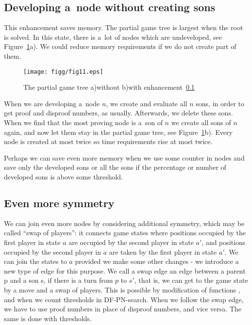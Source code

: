 \subsection{Developing a~node without creating sons} \label{lastenh}

This enhancement saves memory. The partial game tree is largest when the root is
solved. In this state, there is a~lot of nodes which are undeveloped, see 
Figure~\ref{jedenact}a). We could reduce memory requirements if we do not
create part of them. 

\begin{figure}
	\centerline{\mbox{\texttt{[image: figg/fig11.eps]}}}
	\caption{The partial game tree a)without b)with enhancement~\ref{lastenh}}
	\label{jedenact}
\end{figure}

When we are developing a~node $n$, we create and evaluate all $n$ sons, in order
to get proof and disproof numbers, as usually. Afterwards, we delete these
sons. When we find that the  most proving node is a~son of $n$ we create all
sons of $n$ again, and now let them stay in the partial game tree, see
Figure~\ref{jedenact}b). Every node is created at most twice so time
requirements rise at most twice.  

Perhaps we can save even more memory when we use some counter in nodes
and save only the developed sons or all the sons if the percentage or number 
of developed sons is above some threshold.

\subsection{Even more symmetry} \label{lastenh2}

We can join even more nodes by considering additional symmetry, which
may be called ``swap of players'': it connects game states where
positions occupied by the first player in state $a$ are occupied by
the second player in state $a'$, and positions occupied by the second
player in $a$ are taken by the first player in state $a'$. We can join
the states to $a$ provided we make some other changes - we introduce a
new type of edge for this purpose. We call a swap edge an edge between
a parent p and a son s, if there is a turn from $p$ to $s'$, that is,
we can get to the game state by a move and a swap of players. This is
possible by modification of functions ,
 and when we count thresholds in
DF-PN-search. When we follow the swap edge, we have to use proof numbers in
place of disproof numbers, and vice versa. The same is done with
thresholds.

